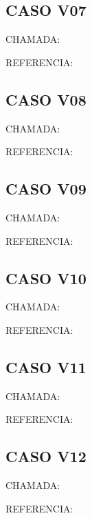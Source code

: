 \documentclass{undftex}
\begin{document}
\begin{refsection}\section*{CASO V07}\noindent CHAMADA:  \par\noindent REFERENCIA:\par\printbibliography[heading=none,check=undfconsultadas]\end{refsection}\clearpage
\begin{refsection}\section*{CASO V08}\noindent CHAMADA:  \par\noindent REFERENCIA:\par\printbibliography[heading=none,check=undfconsultadas]\end{refsection}\clearpage
\begin{refsection}\section*{CASO V09}\noindent CHAMADA:  \par\noindent REFERENCIA:\par\printbibliography[heading=none,check=undfconsultadas]\end{refsection}\clearpage
\begin{refsection}\section*{CASO V10}\noindent CHAMADA:  \par\noindent REFERENCIA:\par\printbibliography[heading=none,check=undfconsultadas]\end{refsection}\clearpage
\begin{refsection}\section*{CASO V11}\noindent CHAMADA:  \par\noindent REFERENCIA:\par\printbibliography[heading=none,check=undfconsultadas]\end{refsection}\clearpage
\begin{refsection}\section*{CASO V12}\noindent CHAMADA:  \par\noindent REFERENCIA:\par\printbibliography[heading=none,check=undfconsultadas]\end{refsection}\clearpage
\end{document}
